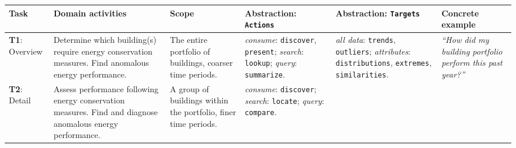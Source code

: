 \documentclass[journal]{vgtc}                %
\begin{document}
\begin{table}[ht]\renewcommand{\arraystretch}{1}\addtolength{\tabcolsep}{-1pt}
    \begin{center}
    \scriptsize
    \renewcommand{\arraystretch}{0.9}
    \begin{tabular}{p{}|>{\RaggedRight}p{}|>{\RaggedRight}p{}|>{\RaggedRight}p{}|>{\RaggedRight}p{}|>{\RaggedRight}p{}}

        \rowcolor{nmYellow}
    
        {\bf Task} & \cellcolor{nmOrange} {\bf Domain activities} & \cellcolor{nmOrange} {\bf Scope} & {\bf Abstraction: {\tt Actions}} & {\bf Abstraction: {\tt Targets}} & {\bf Concrete example} \\ \hline  
        
        \cellcolor{nmYellow} {\bf T1}: Overview 
        
        & \cellcolor{nmOrange} Determine which building(s) require energy conservation measures. Find anomalous energy performance.
        
        & \cellcolor{nmOrange} The entire portfolio of buildings, coarser time periods. 
        
        & {\it consume}: {\tt discover}, {\tt present}; {\it search}: {\tt lookup}; {\it query}: {\tt summarize}.
        
        & {\it all data}: {\tt trends}, {\tt outliers}; {\it attributes}: {\tt distributions}, {\tt extremes}, {\tt similarities}. 
        
        & {\it ``How did my building portfolio perform this past year?''} \\ \hline
        \cellcolor{nmYellow} {\bf T2}: Detail 
        
        & \cellcolor{nmOrange} Assess performance following energy conservation measures. Find and diagnose anomalous energy performance. 
        
        & \cellcolor{nmOrange} A group of buildings within the portfolio, finer time periods.
        
        & {\it consume}: {\tt discover}; {\it search}: {\tt locate}; {\it query}: {\tt compare}. 
        

\end{tabular}
\end{center}
\end{table}
\end{document}
